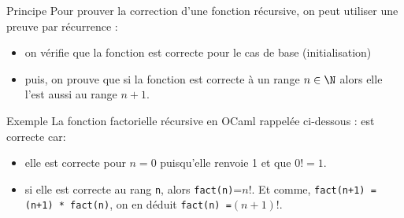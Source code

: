 \documentclass[10pt]{beamer}
\begin{document}
\begin{frame}[fragile]{\Ctitle}{\stitle}
	\begin{block}{Principe}
		Pour prouver la correction d'une fonction récursive, on peut utiliser une preuve par récurrence :
		\begin{itemize}
		\item<2-> on vérifie que la fonction est correcte pour le cas de base (initialisation)
		\item<3-> puis, on prouve que si la fonction est correcte à un range $n \in \N$ alors elle l'est aussi au range $n+1$.
		\end{itemize}
	\end{block}
	{
		\begin{exampleblock}{Exemple}
			La fonction factorielle récursive en OCaml rappelée ci-dessous :
			est correcte car:
			\begin{itemize}
			\item<5-> elle est correcte pour $n=0$ puisqu'elle renvoie 1 et que $0!=1$.
			\item<6-> si elle est correcte au rang {\tt n}, alors {\tt fact(n)}=$n!$. Et comme, {\tt fact(n+1) = (n+1) * fact(n)}, on en déduit {\tt fact(n) =}$(n+1)!$.
		\end{itemize}
		\end{exampleblock}
	}
\end{frame}
\end{document}
